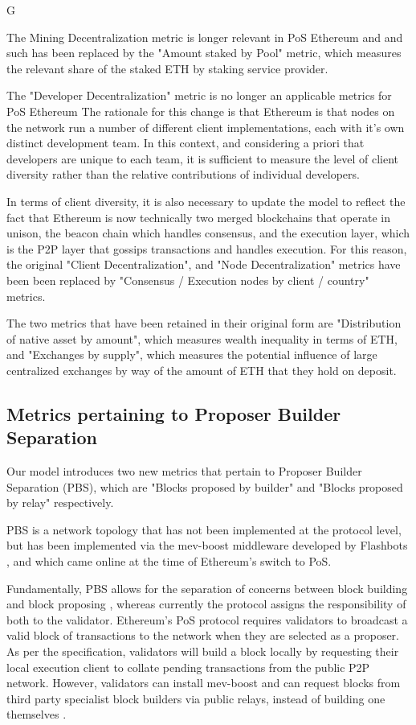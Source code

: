 G\documentclass[conference]{IEEEtran}
\begin{document}
The Mining Decentralization metric is longer relevant in PoS Ethereum and and such has been replaced by the "Amount staked by Pool" metric, which measures the relevant share of the staked ETH by staking service provider. 

The "Developer Decentralization" metric is no longer an applicable metrics for PoS Ethereum The rationale for this  change is that Ethereum is that nodes on the network run a number of different client implementations, each with it's own distinct development team.  In this context, and considering a priori that developers are unique to each team, it is sufficient to measure the level of client diversity rather than the relative contributions of individual developers. 

In terms of client diversity, it is also necessary to update the model to reflect the fact that Ethereum is now technically two merged blockchains that operate in unison, the beacon chain which handles consensus, and the execution layer, which is the P2P layer that gossips transactions and handles execution.  For this reason, the original "Client Decentralization", and "Node Decentralization" metrics have been been replaced by "Consensus / Execution nodes by client / country" metrics. 

The two metrics that have been retained in their original form are "Distribution of native asset by amount", which measures wealth inequality in terms of ETH, and "Exchanges by supply", which measures the potential influence of large centralized exchanges by way of the amount of ETH that they hold on deposit.

\subsection{Metrics pertaining to Proposer Builder Separation}

Our model introduces two new metrics that pertain to Proposer Builder Separation (PBS), which are "Blocks proposed by builder" and "Blocks proposed by relay" respectively.

PBS is a network topology that has not been implemented at the protocol level, but has been implemented via the mev-boost middleware developed by Flashbots \cite{gosselin2021}, and which came online at the time of Ethereum's switch to PoS.

Fundamentally, PBS allows for the separation of concerns between block building and block proposing \cite{ethereum2023}, whereas currently the protocol assigns the responsibility of both to the validator.  Ethereum's PoS protocol requires validators to broadcast a valid block of transactions to the network when they are selected as a proposer.  As per the specification, validators will build a block locally by requesting their local execution client to collate pending transactions from the public P2P network. However, validators can install mev-boost and can request blocks from third party specialist block builders via public relays, instead of building one themselves \cite{ethereum2022}.
\end{document}
